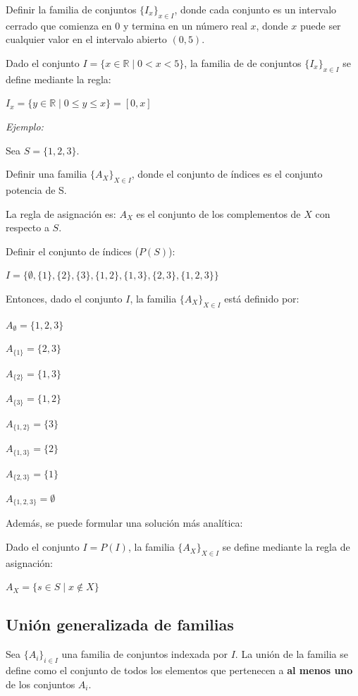 \documentclass{article}
\begin{document}
Definir la familia de conjuntos $\{I_x\}_{x \in I}$, donde cada conjunto es un intervalo cerrado que comienza en $0$ y termina en un número real $x$, donde $x$ puede ser cualquier valor en el intervalo abierto $(0, 5)$.

Dado el conjunto $I = \{x \in \mathbb{R} \mid 0 < x < 5\}$, la familia de de conjuntos $\{I_x\}_{x \in I}$ se define mediante la regla:

$I_x = \{y \in \mathbb{R} \mid 0 \le y \le x\} = \left[0, x\right]$

\textit{Ejemplo:}

Sea $S = \{1, 2, 3\}$. 

Definir una familia $\{A_X\}_{X \in I}$, donde el conjunto de índices es el conjunto potencia de S.

La regla de asignación es: $A_X$ es el conjunto de los complementos de $X$ con respecto a $S$.

Definir el conjunto de índices ($P(S)$):

$I = \{ \emptyset, \{1\}, \{2\}, \{3\}, \{1, 2\}, \{1, 3\}, \{2, 3\}, \{1,2,3\} \}$

Entonces, dado el conjunto $I$, la familia $\{A_X\}_{X \in I}$ está definido por:

$A_{\emptyset} = \{1, 2, 3\}$

$A_{\{1\}} = \{2, 3\}$

$A_{\{2\}} = \{1, 3\}$

$A_{\{3\}} = \{1, 2\}$

$A_{\{1, 2\}} = \{3\}$

$A_{\{1, 3\}} = \{2\}$

$A_{\{2, 3\}} = \{1\}$

$A_{\{1, 2, 3\}} = \emptyset$

Además, se puede formular una solución más analítica:

Dado el conjunto $I = P(I)$, la familia $\{A_X\}_{X \in I}$ se define mediante la regla de asignación:

$A_X = \{s \in S \mid x \notin X\}$

\subsection{Unión generalizada de familias}

Sea $\{A_i\}_{i \in I}$ una familia de conjuntos indexada por $I$. La unión de la familia se define como el conjunto de todos los elementos que pertenecen a \textbf{al menos uno} de los conjuntos $A_i$.
\end{document}
